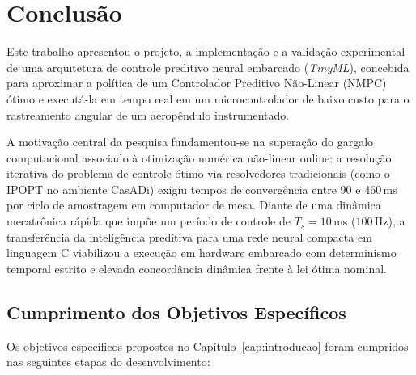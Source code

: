 \chapter{Conclusão}
\label{cap:conclusao}

Este trabalho apresentou o projeto, a implementação e a validação experimental de uma arquitetura de controle preditivo neural embarcado (\textit{TinyML}), concebida para aproximar a política de um Controlador Preditivo Não-Linear (NMPC) ótimo e executá-la em tempo real em um microcontrolador de baixo custo para o rastreamento angular de um aeropêndulo instrumentado.

A motivação central da pesquisa fundamentou-se na superação do gargalo computacional associado à otimização numérica não-linear online: a resolução iterativa do problema de controle ótimo via resolvedores tradicionais (como o IPOPT no ambiente CasADi) exigiu tempos de convergência entre 90 e 460\,ms por ciclo de amostragem em computador de mesa. Diante de uma dinâmica mecatrônica rápida que impõe um período de controle de $T_s = 10$\,ms ($100$\,Hz), a transferência da inteligência preditiva para uma rede neural compacta em linguagem C viabilizou a execução em hardware embarcado com determinismo temporal estrito e elevada concordância dinâmica frente à lei ótima nominal.

\section{Cumprimento dos Objetivos Específicos}
\label{sec:conclusao_objetivos}

Os objetivos específicos propostos no Capítulo~\ref{cap:introducao} foram cumpridos nas seguintes etapas do desenvolvimento:

